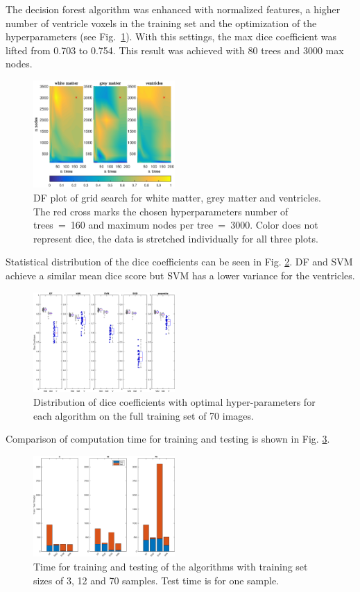 \documentclass[journal]{IEEEtran}
\begin{document}
The decision forest algorithm was enhanced with normalized features, a higher number of ventricle voxels in the training set and the optimization of the hyperparameters (see Fig.~\ref{f.df_white}). With this settings, the max dice coefficient was lifted from 0.703 to 0.754. This result was achieved with 80 trees and 3000 max nodes.

\begin{figure}[h!]\label{f.df_white}
	\centering
	\includegraphics[width=0.48\textwidth]{images/df_grid}
	\caption{DF plot of grid search for white matter, grey matter and ventricles. The red cross marks the chosen hyperparameters number of trees~=~160 and maximum nodes per tree~=~3000. Color does not represent dice, the data is stretched individually for all three plots.}
\end{figure}



Statistical distribution of the dice coefficients can be seen in Fig. \ref{f.boxplot}. DF and SVM achieve a similar mean dice score but SVM has a lower variance for the ventricles.
\begin{figure}\label{f.boxplot}
	\centering
	\includegraphics[width=0.48\textwidth]{images/boxplot}
	\caption{Distribution of dice coefficients with optimal hyper-parameters for each algorithm on the full training set of 70 images.}
\end{figure}

Comparison of computation time for training and testing is shown in Fig. \ref{f.runtimebarplot}.
\begin{figure}\label{f.runtimebarplot}
	\centering
	\includegraphics[width=0.48\textwidth]{images/runtimes}
	\caption{Time for training and testing of the algorithms with training set sizes of 3, 12 and 70 samples. Test time is for one sample.}
\end{figure}
\end{document}
